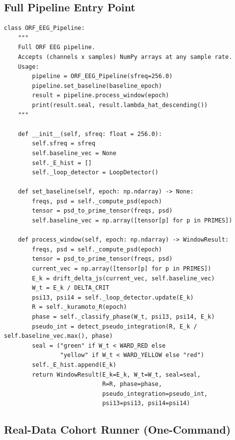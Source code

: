 \documentclass[12pt,a4paper]{article}
\theoremstyle{plain}
\theoremstyle{definition}
\begin{document}
\subsection{Full Pipeline Entry Point}
\label{sec:code:pipeline}

\begin{lstlisting}[style=orfpython, caption={Main pipeline entry point (\texttt{multiplicity\_eeg\_orf.py})}]
class ORF_EEG_Pipeline:
    """
    Full ORF EEG pipeline.
    Accepts (channels x samples) NumPy arrays at any sample rate.
    Usage:
        pipeline = ORF_EEG_Pipeline(sfreq=256.0)
        pipeline.set_baseline(baseline_epoch)
        result = pipeline.process_window(epoch)
        print(result.seal, result.lambda_hat_descending())
    """

    def __init__(self, sfreq: float = 256.0):
        self.sfreq = sfreq
        self.baseline_vec = None
        self._E_hist = []
        self._loop_detector = LoopDetector()

    def set_baseline(self, epoch: np.ndarray) -> None:
        freqs, psd = self._compute_psd(epoch)
        tensor = psd_to_prime_tensor(freqs, psd)
        self.baseline_vec = np.array([tensor[p] for p in PRIMES])

    def process_window(self, epoch: np.ndarray) -> WindowResult:
        freqs, psd = self._compute_psd(epoch)
        tensor = psd_to_prime_tensor(freqs, psd)
        current_vec = np.array([tensor[p] for p in PRIMES])
        E_k = drift_delta_js(current_vec, self.baseline_vec)
        W_t = E_k / DELTA_CRIT
        psi13, psi14 = self._loop_detector.update(E_k)
        R = self._kuramoto_R(epoch)
        phase = self._classify_phase(W_t, psi13, psi14, E_k)
        pseudo_int = detect_pseudo_integration(R, E_k / self.baseline_vec.max(), phase)
        seal = ("green" if W_t < WARD_RED else
                "yellow" if W_t < WARD_YELLOW else "red")
        self._E_hist.append(E_k)
        return WindowResult(E_k=E_k, W_t=W_t, seal=seal,
                            R=R, phase=phase,
                            pseudo_integration=pseudo_int,
                            psi13=psi13, psi14=psi14)
\end{lstlisting}

\subsection{Real-Data Cohort Runner (One-Command)}
\label{sec:code:cohort}
\end{document}
